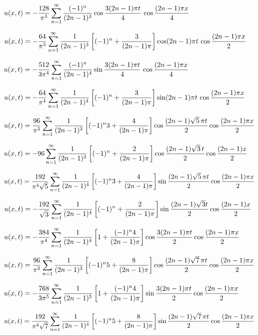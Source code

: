 $u(x,t)=-\displaystyle
\frac{128}{\pi^{3}}\sum_{n=1}^{\infty}\frac{(-1)^{n}}{(2n-1)^{3}}\cos\frac{3(2n-1)\pi t}{4}\,\cos\frac{(2n-1)\pi x}{4}$

$u(x,t)=-\displaystyle\frac{64}{\pi^{3}}\sum_{n=1}^{\infty}\frac{1}{(2n-1)^{3}}\left[
(-1)^{n}+\frac{3}{(2n-1)\pi}\right]\cos(2n-1)\pi t\,\cos\frac{(2n-1)\pi
x}{2}$

$u(x,t)=-\displaystyle
\frac{512}{3\pi^{4}}\sum_{n=1}^{\infty}\frac{(-1)^{n}}{(2n-1)^{4}}\sin\frac{3(2n-1)\pi t}{4}\,\cos\frac{(2n-1)\pi x}{4}$

$u(x,t)=-\displaystyle\frac{64}{\pi^{4}}\sum_{n=1}^{\infty}\frac{1}{(2n-1)^{4}}\left[
(-1)^{n}+\frac{3}{(2n-1)\pi}\right]\sin(2n-1)\pi t\,\cos\frac{(2n-1)\pi
x}{2}$

$u(x,t)=\displaystyle\frac{96}{\pi^{3}}\sum_{n=1}^{\infty}\frac{1}{(2n-1)^{3}}\left[
(-1)^{n}3+\frac{4}{(2n-1)\pi}\right]\cos\frac{(2n-1)\sqrt{5}\,\pi
t}{2}\cos\frac{(2n-1)\pi x}{2}$

$u(x,t)=-\displaystyle96\sum_{n=1}^{\infty}\frac{1}{(2n-1)^{3}}\left[
(-1)^{n}+\frac{2}{(2n-1)\pi}\right]\cos\frac{(2n-1)\sqrt{3}\,t}{2}\cos\frac{(2n-1)
x}{2}$

$u(x,t)=\displaystyle\frac{192}{\pi^{4}\sqrt{5}}\sum_{n=1}^{\infty}\frac{1}{(2n-1)^{4}}\left[
(-1)^{n}3+\frac{4}{(2n-1)\pi}\right]\sin\frac{(2n-1)\sqrt{5}\,\pi
t}{2}\cos\frac{(2n-1)\pi x}{2}$

$u(x,t)=-\displaystyle\frac{192}{\sqrt{3}}\sum_{n=1}^{\infty}\frac{1}{(2n-1)^{4}}\left[
(-1)^{n}+\frac{2}{(2n-1)\pi}\right]\sin\frac{(2n-1)\sqrt{3}t}{2}\cos\frac{(2n-1)
x}{2}$

$u(x,t)=-\displaystyle\frac{384}{\pi^{4}}\sum_{n=1}^{\infty}\frac{1}{(2n-1)^{4}}\left[
1+\frac{(-1)^{n}4}{(2n-1)\pi}\right]\cos\frac{3(2n-1)\pi t}{2}\cos\frac{(2n-1)\pi
x}{2}$

$u(x,t)=\displaystyle\frac{96}{\pi^{3}}\sum_{n=1}^{\infty}\frac{1}{(2n-1)^{3}}\left[
(-1)^{n}5+\frac{8}{(2n-1)\pi}\right]\cos\frac{(2n-1)\sqrt{7}\,\pi
t}{2}\cos\frac{(2n-1)\pi x}{2}$

$u(x,t)=-\displaystyle\frac{768}{3\pi^{5}}\sum_{n=1}^{\infty}\frac{1}{(2n-1)^{5}}\left[
1+\frac{(-1)^{n}4}{(2n-1)\pi}\right]\sin\frac{3(2n-1)\pi t}{2}\cos\frac{(2n-1)\pi
x}{2}$

$u(x,t)=\displaystyle\frac{192}{\pi^{4}\sqrt{7}}\sum_{n=1}^{\infty}\frac{1}{(2n-1)^{4}}\left[
(-1)^{n}5+\frac{8}{(2n-1)\pi}\right]\sin\frac{(2n-1)\sqrt{7}\,\pi
t}{2}\cos\frac{(2n-1)\pi x}{2}$

